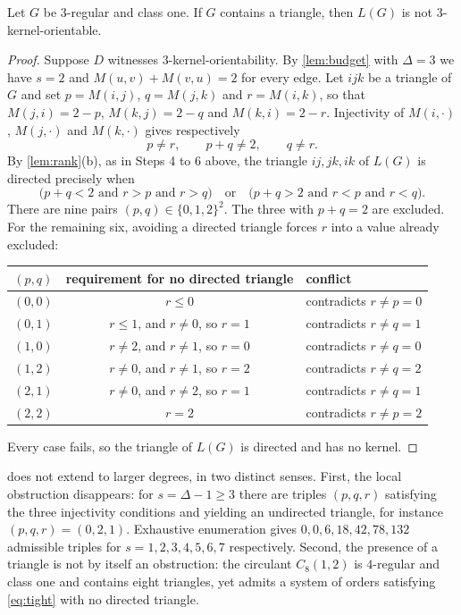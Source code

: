 \documentclass[11pt]{article}
\numberwithin{equation}{section}
\theoremstyle{plain}
\newcommand{\LG}{L}
\begin{document}
\begin{proposition}\label{prop:cubic}
Let $G$ be $3$-regular and class one. If $G$ contains a triangle, then $\LG(G)$ is not
$3$-kernel-orientable.
\end{proposition}

\begin{proof}
Suppose $D$ witnesses $3$-kernel-orientability. By \cref{lem:budget} with $\Delta=3$ we have
$s=2$ and $M(u,v)+M(v,u)=2$ for every edge. Let $ijk$ be a triangle of $G$ and set
$p=M(i,j)$, $q=M(j,k)$ and $r=M(i,k)$, so that $M(j,i)=2-p$, $M(k,j)=2-q$ and $M(k,i)=2-r$.
Injectivity of $M(i,\cdot)$, $M(j,\cdot)$ and $M(k,\cdot)$ gives respectively
\[
  p\ne r,\qquad p+q\ne 2,\qquad q\ne r .
\]
By \cref{lem:rank}(b), as in Steps 4 to 6 above, the triangle $ij,jk,ik$ of $\LG(G)$ is
directed precisely when
\[
  \bigl(p+q<2 \text{ and } r>p \text{ and } r>q\bigr)\quad\text{or}\quad
  \bigl(p+q>2 \text{ and } r<p \text{ and } r<q\bigr).
\]
There are nine pairs $(p,q)\in\{0,1,2\}^2$. The three with $p+q=2$ are excluded. For the
remaining six, avoiding a directed triangle forces $r$ into a value already excluded:
\begin{center}
\begin{tabular}{ccl}
\hline
$(p,q)$ & requirement for no directed triangle & conflict\\
\hline
$(0,0)$ & $r\le 0$ & contradicts $r\ne p=0$\\
$(0,1)$ & $r\le 1$, and $r\ne 0$, so $r=1$ & contradicts $r\ne q=1$\\
$(1,0)$ & $r\ne 2$, and $r\ne 1$, so $r=0$ & contradicts $r\ne q=0$\\
$(1,2)$ & $r\ne 0$, and $r\ne 1$, so $r=2$ & contradicts $r\ne q=2$\\
$(2,1)$ & $r\ne 0$, and $r\ne 2$, so $r=1$ & contradicts $r\ne q=1$\\
$(2,2)$ & $r=2$ & contradicts $r\ne p=2$\\
\hline
\end{tabular}
\end{center}
Every case fails, so the triangle of $\LG(G)$ is directed and has no kernel.
\end{proof}

\begin{remark}\label{rem:not-triangles}
 does not extend to larger degrees, in two distinct senses. First, the local
obstruction disappears: for $s=\Delta-1\ge 3$ there are triples $(p,q,r)$ satisfying the three
injectivity conditions and yielding an undirected triangle, for instance $(p,q,r)=(0,2,1)$.
Exhaustive enumeration gives $0,0,6,18,42,78,132$ admissible triples for
$s=1,2,3,4,5,6,7$ respectively. Second, the presence of a triangle is not by itself an
obstruction: the circulant $C_8(1,2)$ is $4$-regular and class one and contains eight
triangles, yet admits a system of orders satisfying \eqref{eq:tight} with no directed
triangle.
\end{remark}
\end{document}
